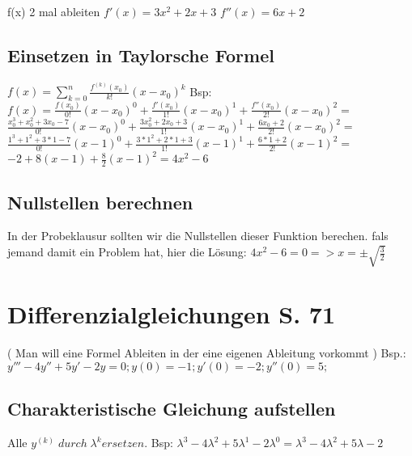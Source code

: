 \documentclass[a4paper, 12pt]{article}
\begin{document}
	f(x) 2 mal ableiten\newline
	\newline
	$f'(x) = 3x^2 + 2x + 3$\newline
	$f''(x) = 6x + 2$


	\subsection {Einsetzen in Taylorsche Formel}

	$ f(x) = \sum_{k=0}^n \frac {f^{(k)}(x_0)}{k!}(x - x_0)^k$\newline
	\newline Bsp:\newline				
	$f(x) = \frac {f(x_0)}{0!} (x - x_0)^0 + \frac {f'(x_0)}{1!} (x - x_0)^1 + \frac {f''(x_0)}{2!} (x - x_0)^2 =$\newline
	\newline $\frac {x_0^3 + x_0^2 + 3x_0 - 7}{0!} (x - x_0)^0 + \frac {3x_0^2 + 2x_0 + 3}{1!} (x - x_0)^1 + \frac {6x_0 + 2}{2!} (x - x_0)^2 = $\newline
	\newline $\frac {1^3 + 1^2 + 3 * 1 - 7}{0!} (x - 1)^0 + \frac {3 *1^2 + 2*1 + 3}{1!} (x - 1)^1 + \frac {6 * 1 + 2}{2!} (x - 1)^2 = $\newline
	\newline $-2+8(x-1)+\frac 8 2 (x-1)^2 = 4x^2 - 6$

	\subsection {Nullstellen berechnen}

	In der Probeklausur sollten wir die Nullstellen dieser Funktion berechen. \newline
	fals jemand damit ein Problem hat, hier die Lösung: \newline
	\newline $ 4x^2 - 6 = 0 => x= \pm \sqrt {\frac 3 2}$  

	\section {Differenzialgleichungen S. 71}

	( Man will eine Formel Ableiten in der eine eigenen Ableitung vorkommt )\newline
	\newline Bsp.: $ y''' - 4y'' +5y' -2y = 0 ; y(0) = -1; y'(0) = -2; y''(0) = 5;$

	\subsection { Charakteristische Gleichung aufstellen} 
	Alle $y^{(k)}\; durch \; \lambda^k ersetzen.$\newline
	\newline Bsp: $ \lambda^3 - 4 \lambda^2 + 5 \lambda^1 - 2\lambda^0 = \lambda^3 - 4 \lambda^2 + 5 \lambda - 2$
\end{document}
